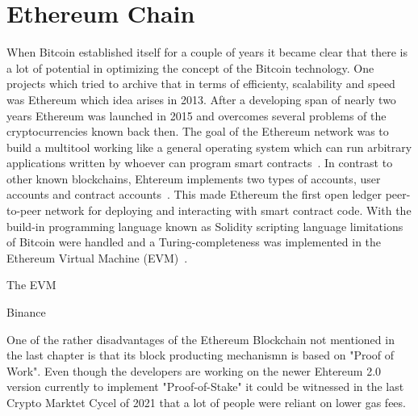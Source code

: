 \section{Ethereum Chain}
When Bitcoin established itself for a couple of years it became clear that there is a lot of potential in optimizing the concept of the Bitcoin technology. One projects which tried to archive that in terms of efficienty, scalability and speed was Ethereum which idea arises in 2013. After a developing span of nearly two years Ethereum was launched in 2015 and overcomes several problems of the cryptocurrencies known back then. The goal of the Ethereum network was to build a multitool working like a general operating system which can run arbitrary applications written by whoever can program smart contracts~\cite{Vitalik2015}.
In contrast to other known blockchains, Ehtereum implements two types of accounts, user accounts and contract accounts~\cite{buterin2014next}. This made Ethereum the first open ledger peer-to-peer network for deploying and interacting with smart contract code. With the build-in programming language known as Solidity scripting language limitations of Bitcoin were handled and a Turing-completeness was implemented in the Ethereum Virtual Machine (EVM)~\cite{Vujicic2018, buterin2014next}.

The EVM 



Binance 

One of the rather disadvantages of the Ethereum Blockchain not mentioned in the last chapter is that its block producting mechanismn is based on "Proof of Work". Even though the developers are working on the newer Ehtereum 2.0 version currently to implement "Proof-of-Stake" it could be witnessed in the last Crypto Marktet Cycel of 2021 that a lot of people were reliant on lower gas fees.